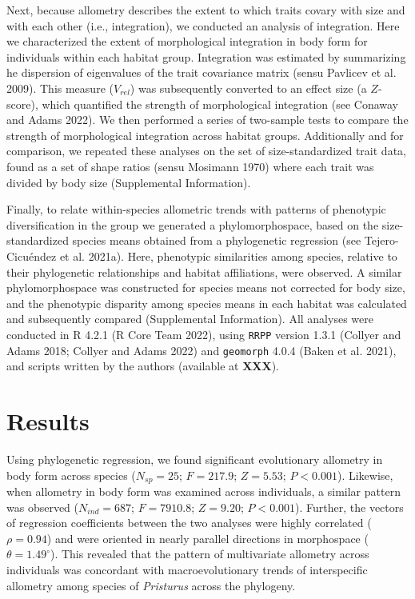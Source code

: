 \documentclass[
  11pt,
]{article}
\begin{document}
Next, because allometry describes the extent to which traits covary with
size and with each other (i.e., integration), we conducted an analysis
of integration. Here we characterized the extent of morphological
integration in body form for individuals within each habitat group.
Integration was estimated by summarizing he dispersion of eigenvalues of
the trait covariance matrix (sensu Pavlicev et al. 2009). This measure
(\(V_{rel}\)) was subsequently converted to an effect size (a
\(Z\)-score), which quantified the strength of morphological integration
(see Conaway and Adams 2022). We then performed a series of two-sample
tests to compare the strength of morphological integration across
habitat groups. Additionally and for comparison, we repeated these
analyses on the set of size-standardized trait data, found as a set of
shape ratios (sensu Mosimann 1970) where each trait was divided by body
size (Supplemental Information). \hfill\break 

Finally, to relate within-species allometric trends with patterns of
phenotypic diversification in the group we generated a phylomorphospace,
based on the size-standardized species means obtained from a
phylogenetic regression (see Tejero-Cicuéndez et al. 2021a). Here,
phenotypic similarities among species, relative to their phylogenetic
relationships and habitat affiliations, were observed. A similar
phylomorphospace was constructed for species means not corrected for
body size, and the phenotypic disparity among species means in each
habitat was calculated and subsequently compared (Supplemental
Information). All analyses were conducted in R 4.2.1 (R Core Team 2022),
using \texttt{RRPP} version 1.3.1 (Collyer and Adams 2018; Collyer and
Adams 2022) and \texttt{geomorph} 4.0.4 (Baken et al. 2021), and scripts
written by the authors (available at \textbf{XXX}).

\hypertarget{results}{%
\section{Results}\label{results}}

Using phylogenetic regression, we found significant evolutionary
allometry in body form across species (\(N_{sp}=25\); \(F = 217.9\);
\(Z =5.53\); \(P < 0.001\)). Likewise, when allometry in body form was
examined across individuals, a similar pattern was observed
(\(N_{ind}=687\); \(F = 7910.8\); \(Z =9.20\); \(P < 0.001\)). Further,
the vectors of regression coefficients between the two analyses were
highly correlated (\(\rho = 0.94\)) and were oriented in nearly parallel
directions in morphospace (\(\theta = 1.49^\circ\)). This revealed that
the pattern of multivariate allometry across individuals was concordant
with macroevolutionary trends of interspecific allometry among species
of \emph{Pristurus} across the phylogeny. \hfill\break
\end{document}

